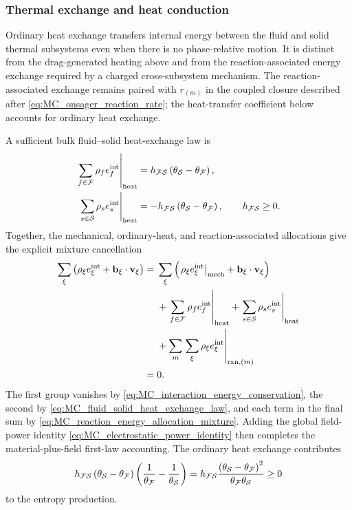 \subsubsection{Thermal exchange and heat conduction}
\label{sec:MC_thermal_exchange_conduction}

Ordinary heat exchange transfers internal energy between the fluid and solid
thermal subsystems even when there is no phase-relative motion.  It is distinct
from the drag-generated heating above and from the reaction-associated energy
exchange required by a charged cross-subsystem mechanism.  The reaction-associated
exchange remains paired with \(r_{(m)}\) in the coupled closure described after
\eqref{eq:MC_onsager_reaction_rate}; the heat-transfer coefficient below
accounts for ordinary heat exchange.

A sufficient bulk fluid--solid heat-exchange law is
%
\begin{equation}
	\begin{aligned}
		\left.
		\sum_{f\in\mathcal{F}}\rho_f e_f^{\rm int}
		\right\vert_{\rm heat}
		 & =
		h_{\mathcal{F}\mathcal{S}}
		\left(
		\theta_{\mathcal{S}}-\theta_{\mathcal{F}}
		\right),
		\\
		\left.
		\sum_{s\in\mathcal{S}}\rho_s e_s^{\rm int}
		\right\vert_{\rm heat}
		 & =
		-h_{\mathcal{F}\mathcal{S}}
		\left(
		\theta_{\mathcal{S}}-\theta_{\mathcal{F}}
		\right),
		\qquad
		h_{\mathcal{F}\mathcal{S}}\ge0 .
	\end{aligned}
	\label{eq:MC_fluid_solid_heat_exchange_law}
\end{equation}
%
Together, the mechanical, ordinary-heat, and reaction-associated allocations
give the explicit mixture cancellation
%
\begin{align}
	\sum_\xi
	\left(
		\rho_\xi e_\xi^{\rm int}
		+
		\mathbf{b}_\xi\cdot\mathbf{v}_\xi
	\right)
	={}&
	\sum_\xi
	\left(
		\left.
		\rho_\xi e_\xi^{\rm int}
		\right\vert_{\rm mech}
		+
		\mathbf{b}_\xi\cdot\mathbf{v}_\xi
	\right)
	\notag \\
	&+
	\left.
	\sum_{f\in\mathcal{F}}
	\rho_f e_f^{\rm int}
	\right\vert_{\rm heat}
	+
	\left.
	\sum_{s\in\mathcal{S}}
	\rho_s e_s^{\rm int}
	\right\vert_{\rm heat}
	\notag \\
	&+
	\sum_m
	\left.
	\sum_\xi
	\rho_\xi e_\xi^{\rm int}
	\right\vert_{{\rm rxn},(m)}
	\notag \\
	={}&0 .
	\label{eq:MC_total_internal_exchange_cancellation}
\end{align}
%
The first group vanishes by
\eqref{eq:MC_interaction_energy_conservation}, the second by
\eqref{eq:MC_fluid_solid_heat_exchange_law}, and each term in the final sum by
\eqref{eq:MC_reaction_energy_allocation_mixture}.  Adding the global field-power
identity \eqref{eq:MC_electrostatic_power_identity} then completes the
material-plus-field first-law accounting.  The ordinary heat exchange
contributes
%
\begin{equation}
	h_{\mathcal{F}\mathcal{S}}
	\left(
	\theta_{\mathcal{S}}-\theta_{\mathcal{F}}
	\right)
	\left(
	\frac{1}{\theta_{\mathcal{F}}}
	-
	\frac{1}{\theta_{\mathcal{S}}}
	\right)
	=
	h_{\mathcal{F}\mathcal{S}}
	\frac{
		\left(
		\theta_{\mathcal{S}}-\theta_{\mathcal{F}}
		\right)^2
	}{
		\theta_{\mathcal{F}}\theta_{\mathcal{S}}
	}
	\ge0
	\label{eq:MC_fluid_solid_heat_exchange_positive}
\end{equation}
%
to the entropy production.

